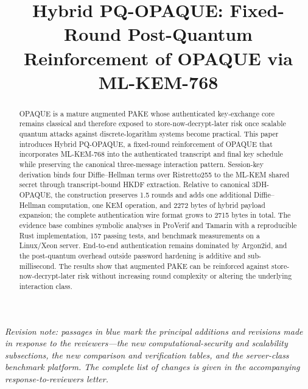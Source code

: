 \documentclass[conference]{IEEEtran}
\begin{document}
\title{Hybrid PQ-OPAQUE: Fixed-Round Post-Quantum Reinforcement of OPAQUE via ML-KEM-768}


\author{
}

\maketitle

{\color{blue}\noindent\footnotesize\textit{Revision note: passages in blue mark the principal additions and revisions made in response to the reviewers---the new computational-security and scalability subsections, the new comparison and verification tables, and the server-class benchmark platform. The complete list of changes is given in the accompanying response-to-reviewers letter.}\par}

\begin{abstract}
OPAQUE is a mature augmented PAKE whose authenticated key-exchange core remains classical and therefore exposed to store-now-decrypt-later risk once scalable quantum attacks against discrete-logarithm systems become practical. This paper introduces Hybrid PQ-OPAQUE, a fixed-round reinforcement of OPAQUE that incorporates ML-KEM-768 into the authenticated transcript and final key schedule while preserving the canonical three-message interaction pattern. Session-key derivation binds four Diffie--Hellman terms over Ristretto255 to the ML-KEM shared secret through transcript-bound HKDF extraction. Relative to canonical 3DH-OPAQUE, the construction preserves 1.5 rounds and adds one additional Diffie--Hellman computation, one KEM operation, and 2272 bytes of hybrid payload expansion; the complete authentication wire format grows to 2715 bytes in total. The evidence base combines symbolic analyses in ProVerif and Tamarin with a reproducible Rust implementation, 157 passing tests, and benchmark measurements on {\color{blue}a Linux/Xeon server}. End-to-end authentication remains dominated by Argon2id, and the post-quantum overhead outside password hardening is additive and sub-millisecond. The results show that augmented PAKE can be reinforced against store-now-decrypt-later risk without increasing round complexity or altering the underlying interaction class.
\end{abstract}
\end{document}
